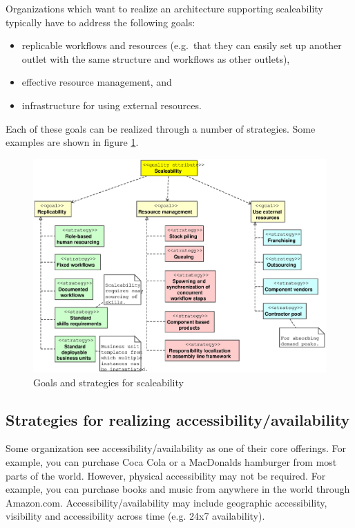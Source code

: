\documentclass[11pt,english,a4]{article}
\begin{document}
Organizations which want to realize an architecture supporting scaleability typically have to address the following goals: 
\begin{itemize}
  \item replicable workflows and resources (e.g.\ that they can easily set up another outlet with the same structure and workflows as other outlets),
  \item effective resource management, and
  \item infrastructure for using external resources.
\end{itemize}
\noindent  
Each of these goals can be realized through a number of strategies. Some examples are shown in figure \ref{scaleabilityTactics_fig}.

\begin{figure}[hbt]
  \begin{center}
    \includegraphics[scale=0.4]{scaleabilityTactics}
    \caption{Goals and strategies for scaleability}\label{scaleabilityTactics_fig}
  \end{center}
\end{figure}


\subsection{Strategies for realizing accessibility/availability}

Some organization see accessibility/availability as one of their core offerings. For example, you can purchase Coca Cola or a MacDonalds hamburger from most parts of the world. However, physical accessibility may not be required. For example, you can purchase books and music from anywhere in the world through Amazon.com. Accessibility/availability may include geographic accessibility, visibility and accessibility across time (e.g. 24x7 availability).
\end{document}
